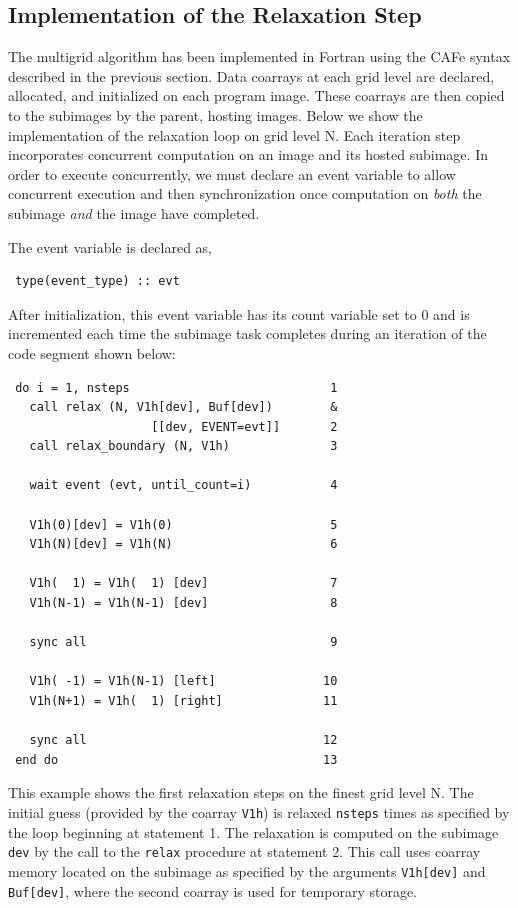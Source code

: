 \subsection{Implementation of the Relaxation Step}

The multigrid algorithm has been implemented in Fortran using the CAFe
syntax described in the previous section. Data coarrays at each grid
level are declared, allocated, and initialized on each program image.
These coarrays are then copied to the subimages by the parent, hosting
images.  Below we show the implementation of the relaxation loop on
grid level N.  Each iteration step incorporates concurrent computation
on an image and its hosted subimage.  In order to execute
concurrently, we must declare an event variable to allow concurrent
execution and then synchronization once computation on \emph{both} 
the subimage \emph{and} the image have completed.

The event variable is declared as,
\begin{verbatim}
 type(event_type) :: evt
\end{verbatim}
After initialization, this event variable has its count variable set to 0 and is incremented
each time the subimage task completes during an iteration of the code segment shown below:

\vskip 20pt

\small
\begin{verbatim}
 do i = 1, nsteps                            1
   call relax (N, V1h[dev], Buf[dev])        &
                    [[dev, EVENT=evt]]       2
   call relax_boundary (N, V1h)              3

   wait event (evt, until_count=i)           4

   V1h(0)[dev] = V1h(0)                      5
   V1h(N)[dev] = V1h(N)                      6

   V1h(  1) = V1h(  1) [dev]                 7
   V1h(N-1) = V1h(N-1) [dev]                 8

   sync all                                  9

   V1h( -1) = V1h(N-1) [left]               10
   V1h(N+1) = V1h(  1) [right]              11

   sync all                                 12
 end do                                     13
\end{verbatim}
\normalsize

This example shows the first relaxation steps on the finest grid level N.  The initial
guess (provided by the coarray \texttt{V1h}) is relaxed \texttt{nsteps} times as
specified by the loop beginning at statement 1.  The relaxation is computed on
the subimage \texttt{dev} by the call to the \texttt{relax} procedure at statement 2.
This call uses coarray memory located on the subimage as specified by the arguments
\texttt{V1h[dev]} and \texttt{Buf[dev]}, where the second coarray is used for temporary
storage.

